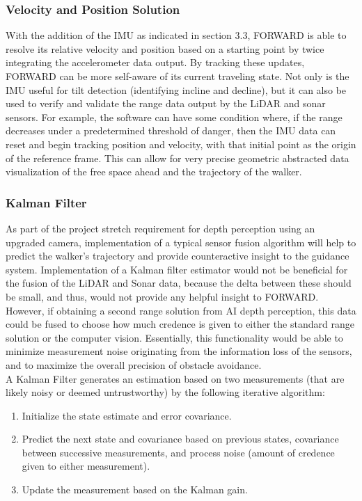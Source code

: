 \subsubsection{Velocity and Position Solution}
\noindent With the addition of the IMU as indicated in section 3.3, FORWARD is able to resolve its relative velocity and position based on a starting point by twice integrating the accelerometer data output. By tracking these updates, FORWARD can be more self-aware of its current traveling state. Not only is the IMU useful for tilt detection (identifying incline and decline), but it can also be used to verify and validate the range data output by the LiDAR and sonar sensors. For example, the software can have some condition where, if the range decreases under a predetermined threshold of danger, then the IMU data can reset and begin tracking position and velocity, with that initial point as the origin of the reference frame. This can allow for very precise geometric abstracted data visualization of the free space ahead and the trajectory of the walker.\\

\subsubsection{Kalman Filter}
\noindent As part of the project stretch requirement for depth perception using an upgraded camera, implementation of a typical sensor fusion algorithm will help to predict the walker's trajectory and provide counteractive insight to the guidance system. Implementation of a Kalman filter estimator would not be beneficial for the fusion of the LiDAR and Sonar data, because the delta between these should be small, and thus, would not provide any helpful insight to FORWARD. However, if obtaining a second range solution from AI depth perception, this data could be fused to choose how much credence is given to either the standard range solution or the computer vision. Essentially, this functionality would be able to minimize measurement noise originating from the information loss of the sensors, and to maximize the overall precision of obstacle avoidance. \cite{kalman} \\

\noindent A Kalman Filter generates an estimation based on two measurements (that are likely noisy or deemed untrustworthy) by the following iterative algorithm:
\begin{enumerate}
	\item Initialize the state estimate and error covariance.
	\item Predict the next state and covariance based on previous states, covariance between successive measurements, and process noise (amount of credence given to either measurement).
	\item Update the measurement based on the Kalman gain.
\end{enumerate}

